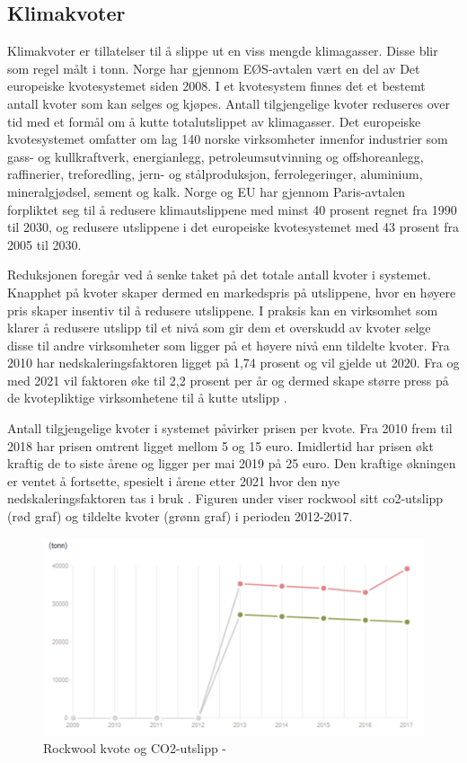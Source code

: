 \subsection{Klimakvoter}
Klimakvoter er tillatelser til å slippe ut en viss mengde klimagasser. Disse blir som regel målt i tonn. Norge har gjennom EØS-avtalen vært en del av Det europeiske kvotesystemet siden 2008. I et kvotesystem finnes det et bestemt antall kvoter som kan selges og kjøpes. Antall tilgjengelige kvoter reduseres over tid med et formål om å kutte totalutslippet av klimagasser. Det europeiske kvotesystemet omfatter om lag 140 norske virksomheter innenfor industrier som gass- og kullkraftverk, energianlegg, petroleumsutvinning og offshoreanlegg, raffinerier, treforedling, jern- og stålproduksjon, ferrolegeringer, aluminium, mineralgjødsel, sement og kalk. Norge og EU har gjennom Paris-avtalen forpliktet seg til å redusere klimautslippene med minst 40 prosent regnet fra 1990 til 2030, og redusere utslippene i det europeiske kvotesystemet med 43 prosent fra 2005 til 2030.

\indent \newline
Reduksjonen foregår ved å senke taket på det totale antall kvoter i systemet. Knapphet på kvoter skaper dermed en markedspris på utslippene, hvor en høyere pris skaper insentiv til å redusere utslippene. I praksis kan en virksomhet som klarer å redusere utslipp til et nivå som gir dem et overskudd av kvoter selge disse til andre virksomheter som ligger på et høyere nivå enn tildelte kvoter. Fra 2010 har nedskaleringsfaktoren ligget på 1,74 prosent og vil gjelde ut 2020. Fra og med 2021 vil faktoren øke til 2,2 prosent per år og dermed skape større press på de kvotepliktige virksomhetene til å kutte utslipp \cite{klimakvoter}.

\indent \newline
Antall tilgjengelige kvoter i systemet påvirker prisen per kvote. Fra 2010 frem til 2018 har prisen omtrent ligget mellom 5 og 15 euro. Imidlertid har prisen økt kraftig de to siste årene og ligger per mai 2019 på 25 euro. Den kraftige økningen er ventet å fortsette, spesielt i årene etter 2021 hvor den nye nedskaleringsfaktoren tas i bruk \cite{kvotemarked}.
Figuren under viser rockwool sitt co2-utslipp (rød graf) og tildelte kvoter (grønn graf) i perioden 2012-2017.

\begin{figure}[H]
  \includegraphics[width=\linewidth]{bilder/co2utslipp.png}
  \caption{Rockwool kvote og CO2-utslipp - \cite{utslippkvote}}
  \label{fig:co2utslipp}
\end{figure}

